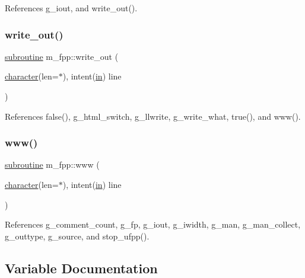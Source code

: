References g\+\_\+iout, and write\+\_\+out().

\mbox{\label{namespacem__fpp_a945cf0930719327ca5ee9a866c11dc7a}} 
\subsubsection{\texorpdfstring{write\+\_\+out()}{write\_out()}}
{\footnotesize\ttfamily \hyperlink{M__stopwatch_83_8txt_acfbcff50169d691ff02d4a123ed70482}{subroutine} m\+\_\+fpp\+::write\+\_\+out (\begin{DoxyParamCaption}\item[{\hyperlink{option__stopwatch_83_8txt_abd4b21fbbd175834027b5224bfe97e66}{character}(len=$\ast$), intent(\hyperlink{M__journal_83_8txt_afce72651d1eed785a2132bee863b2f38}{in})}]{line }\end{DoxyParamCaption})}



References false(), g\+\_\+html\+\_\+switch, g\+\_\+llwrite, g\+\_\+write\+\_\+what, true(), and www().

\mbox{\label{namespacem__fpp_ac474947a9f75959822fccd4d82a05258}} 
\subsubsection{\texorpdfstring{www()}{www()}}
{\footnotesize\ttfamily \hyperlink{M__stopwatch_83_8txt_acfbcff50169d691ff02d4a123ed70482}{subroutine} m\+\_\+fpp\+::www (\begin{DoxyParamCaption}\item[{\hyperlink{option__stopwatch_83_8txt_abd4b21fbbd175834027b5224bfe97e66}{character}(len=$\ast$), intent(\hyperlink{M__journal_83_8txt_afce72651d1eed785a2132bee863b2f38}{in})}]{line }\end{DoxyParamCaption})}



References g\+\_\+comment\+\_\+count, g\+\_\+fp, g\+\_\+iout, g\+\_\+iwidth, g\+\_\+man, g\+\_\+man\+\_\+collect, g\+\_\+outtype, g\+\_\+source, and stop\+\_\+ufpp().



\subsection{Variable Documentation}
\mbox{\label{namespacem__fpp_a3cbfb5247b11d5ebe1563b7cd1564c14}} 
